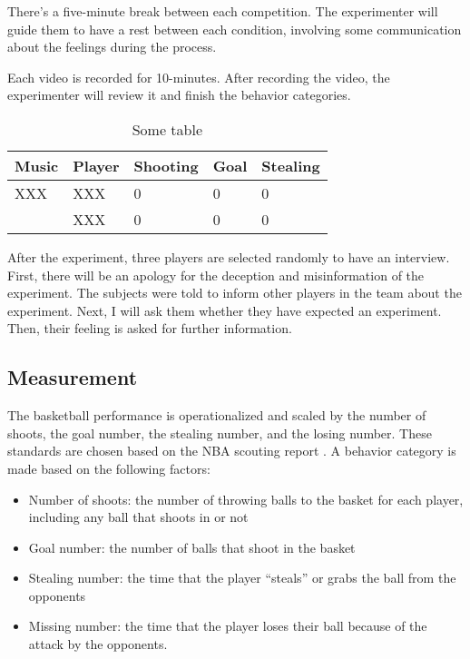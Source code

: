 \documentclass{article}
\begin{document}
There's a five-minute break between each competition. The experimenter will guide them to have a rest between each condition, involving some communication about the feelings during the process.

Each video is recorded for 10-minutes. After recording the video, the experimenter will review it and finish the behavior categories.

\begin{table}[h]
    \centering
    \begin{tabular}{@{}lllll@{}}
        \toprule
        Music & Player & Shooting & Goal & Stealing \\
        \midrule
        XXX & XXX & 0 & 0 & 0 \\
            & XXX & 0 & 0 & 0 \\
        \bottomrule
    \end{tabular}
    \caption{Some table}
    \label{grouptable}
\end{table}

After the experiment, three players are selected randomly to have an interview. First, there will be an apology for the deception and misinformation of the experiment. The subjects were told to inform other players in the team about the experiment. Next, I will ask them whether they have expected an experiment. Then, their feeling is asked for further information.

\subsection{Measurement}
The basketball performance is operationalized and scaled by the number of shoots, the goal number, the stealing number, and the losing number. These standards are chosen based on the NBA scouting report \autocite{NBAZhongGuoGuanFangWangZhanQiuYuanZiLiao2024}. A behavior category is made based on the following factors:

\begin{itemize}
\item Number of shoots: the number of throwing balls to the basket for each player, including any ball that shoots in or not
\item Goal number: the number of balls that shoot in the basket
\item Stealing number: the time that the player ``steals'' or grabs the ball from the opponents
\item Missing number: the time that the player loses their ball because of the attack by the opponents.
\end{itemize}
\end{document}

